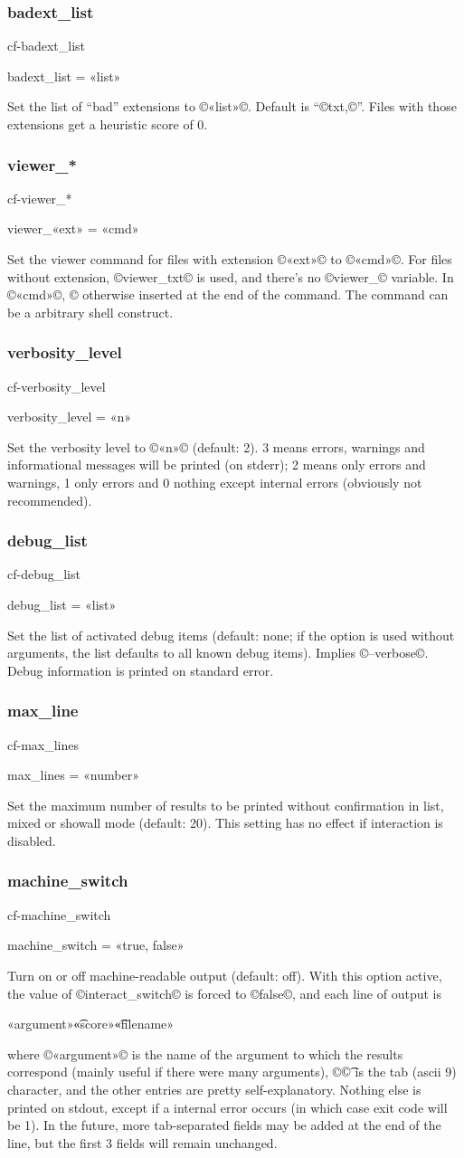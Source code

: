 \documentclass[a4paper, oneside]{scrartcl}
\makeatletter
\newif\ifframed
\newenvironment{cmdsubsub}[2]{%
  \framedfalse \commandes\subsubsection{#1}{#2}%
  }{%
  \endcommandes}
\newenvironment{htcode}{%
  \SaveVerbatim[samepage, gobble=2]{verbmat}%
  }{%
  \endSaveVerbatim
  \par\medskip\noindent\hspace*{\parindent}%
  \BUseVerbatim{verbmat}%
  \par\medskip\@endpetrue}
\makeatother
\begin{document}
\begin{cmdsubsub}{badext_list}{cf-badext_list}
  badext_list = «list»
\end{cmdsubsub}

Set the list of ``bad'' extensions to ©«list»©.  Default is ``©txt,©''. Files
with those extensions get a heuristic score of 0.

\begin{cmdsubsub}{viewer_*}{cf-viewer_*}
  viewer_«ext» = «cmd»
\end{cmdsubsub}

Set the viewer command for files with extension ©«ext»© to ©«cmd»©. For files
without extension, ©viewer_txt© is used, and there's no ©viewer_© variable.
In ©«cmd»©, ©%
otherwise inserted at the end of the command.  The command can be a arbitrary
shell construct. 

\begin{cmdsubsub}{verbosity_level}{cf-verbosity_level}
  verbosity_level = «n»
\end{cmdsubsub}

Set the verbosity level to ©«n»© (default: 2). 3 means errors, warnings and
informational messages will be printed (on stderr); 2 means only errors and
warnings, 1 only errors and 0 nothing except internal errors (obviously not
recommended).

\begin{cmdsubsub}{debug_list}{cf-debug_list}
  debug_list = «list»
\end{cmdsubsub}

Set the list of activated debug items (default: none; if the option is used
without arguments, the list defaults to all known debug items). Implies
©--verbose©. Debug information is printed on standard error.

\begin{cmdsubsub}{max_line}{cf-max_lines}
  max_lines = «number»
\end{cmdsubsub}

Set the maximum number of results to be printed without confirmation in list,
mixed or showall mode (default: 20). This setting has no effect if interaction
is disabled.

\begin{cmdsubsub}{machine_switch}{cf-machine_switch}
  machine_switch = «true, false»
\end{cmdsubsub}

Turn on or off machine-readable output (default: off).  With this option
active, the value of ©interact_switch© is forced to ©false©, and each line of
output is
\begin{htcode}
  «argument»\t«score»\t«filename»
\end{htcode}
where ©«argument»© is the name of the argument to which the results correspond
(mainly useful if there were many arguments), ©\t© is the tab (ascii 9)
character, and the other entries are pretty self-explanatory. Nothing else is
printed on stdout, except if a internal error occurs (in which case exit code
will be 1). In the future, more tab-separated fields may be added at the end
of the line, but the first 3 fields will remain unchanged.
\end{document}
